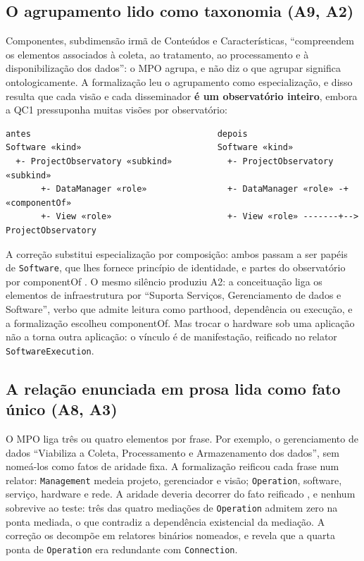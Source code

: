 \subsection{O agrupamento lido como taxonomia (A9, A2)}

Componentes, subdimensão irmã de Conteúdos e Características, ``compreendem os elementos associados à coleta, ao tratamento, ao processamento e à disponibilização dos dados'': o MPO agrupa, e não diz o que agrupar significa ontologicamente. A formalização leu o agrupamento como especialização, e disso resulta que cada visão e cada disseminador \textbf{é um observatório inteiro}, embora a QC1 pressuponha muitas visões por observatório:

\begin{center}
\scriptsize
\begin{BVerbatim}
antes                                     depois
Software «kind»                           Software «kind»
  +- ProjectObservatory «subkind»           +- ProjectObservatory «subkind»
       +- DataManager «role»                +- DataManager «role» -+ «componentOf»
       +- View «role»                       +- View «role» -------+--> ProjectObservatory
\end{BVerbatim}
\end{center}

A correção substitui especialização por composição: ambos passam a ser papéis de \texttt{Software}, que lhes fornece princípio de identidade, e partes do observatório por \guillemotleft{}componentOf\guillemotright{} \cite{guizzardi2005ontological}. O mesmo silêncio produziu A2: a conceituação liga os elementos de infraestrutura por ``Suporta Serviços, Gerenciamento de dados e Software'', verbo que admite leitura como parthood, dependência ou execução, e a formalização escolheu \guillemotleft{}componentOf\guillemotright{}. Mas trocar o hardware sob uma aplicação não a torna outra aplicação: o vínculo é de manifestação, reificado no relator \texttt{SoftwareExecution}.

\subsection{A relação enunciada em prosa lida como fato único (A8, A3)}

O MPO liga três ou quatro elementos por frase. Por exemplo, o gerenciamento de dados ``Viabiliza a Coleta, Processamento e Armazenamento dos dados'', sem nomeá-los como fatos de aridade fixa. A formalização reificou cada frase num relator: \texttt{Management} medeia projeto, gerenciador e visão; \texttt{Operation}, software, serviço, hardware e rede. A aridade deveria decorrer do fato reificado \cite{guizzardi2005ontological}, e nenhum sobrevive ao teste: três das quatro mediações de \texttt{Operation} admitem zero na ponta mediada, o que contradiz a dependência existencial da mediação. A correção os decompõe em relatores binários nomeados, e revela que a quarta ponta de \texttt{Operation} era redundante com \texttt{Connection}.

